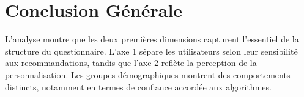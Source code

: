 \documentclass[
]{article}
\begin{document}
\hypertarget{conclusion-guxe9nuxe9rale}{%
\section{Conclusion Générale}\label{conclusion-guxe9nuxe9rale}}

L'analyse montre que les deux premières dimensions capturent l'essentiel
de la structure du questionnaire. L'axe 1 sépare les utilisateurs selon
leur sensibilité aux recommandations, tandis que l'axe 2 reflète la
perception de la personnalisation. Les groupes démographiques montrent
des comportements distincts, notamment en termes de confiance accordée
aux algorithmes.
\end{document}
